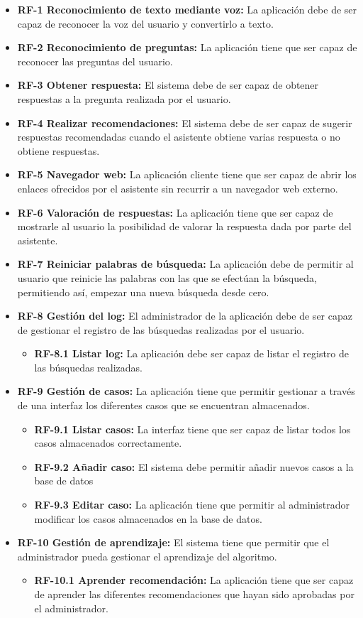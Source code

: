 \begin{itemize}
	\tightlist
	\item
	\textbf{RF-1 Reconocimiento de texto mediante voz:} La aplicación debe de ser capaz de reconocer la voz del usuario y convertirlo a texto.
	\item 
	\textbf{RF-2 Reconocimiento de preguntas:} La aplicación tiene que ser capaz de reconocer las preguntas del usuario.
	\item 
	\textbf{RF-3 Obtener respuesta:} El sistema debe de ser capaz de obtener respuestas a la pregunta realizada por el usuario.
	\item 
	\textbf{RF-4 Realizar recomendaciones:} El sistema debe de ser capaz de sugerir respuestas recomendadas cuando el asistente obtiene varias respuesta o no obtiene respuestas.
	\item 
	\textbf{RF-5 Navegador web:} La aplicación cliente tiene que ser capaz de abrir los enlaces ofrecidos por el asistente sin recurrir a un navegador web externo.
	\item 
	\textbf{RF-6 Valoración de respuestas:} La aplicación tiene que ser capaz de mostrarle al usuario la posibilidad de valorar la respuesta dada por parte del asistente.
	\item 
	\textbf{RF-7 Reiniciar palabras de búsqueda:} La aplicación debe de permitir al usuario que reinicie las palabras con las que se efectúan la búsqueda, permitiendo así, empezar una nueva búsqueda desde cero.
	\item 
	\textbf{RF-8 Gestión del log:} El administrador de la aplicación debe de ser capaz de gestionar el registro de las búsquedas realizadas por el usuario.
	\begin{itemize}
		\item 
		\textbf{RF-8.1 Listar log:} La aplicación debe ser capaz de listar el registro de las búsquedas realizadas.
	\end{itemize}
	\item 
	\textbf{RF-9 Gestión de casos:} La aplicación tiene que permitir gestionar a través de una interfaz los diferentes casos que se encuentran almacenados.
	\begin{itemize}
		\item 
		\textbf{RF-9.1 Listar casos:} La interfaz tiene que ser capaz de listar todos los casos almacenados correctamente.
		\item 
		\textbf{RF-9.2 Añadir caso:} El sistema debe permitir añadir nuevos casos a la base de datos
		\item 
		\textbf{RF-9.3 Editar caso:} La aplicación tiene que permitir al administrador modificar los casos almacenados en la base de datos.
	\end{itemize}
	\item 
	\textbf{RF-10 Gestión de aprendizaje:} El sistema tiene que permitir que el administrador pueda gestionar el aprendizaje del algoritmo.
	\begin{itemize}
		\item 
		\textbf{RF-10.1 Aprender recomendación:} La aplicación tiene que ser capaz de aprender las diferentes recomendaciones que hayan sido aprobadas por el administrador.
	\end{itemize}
\end{itemize}

